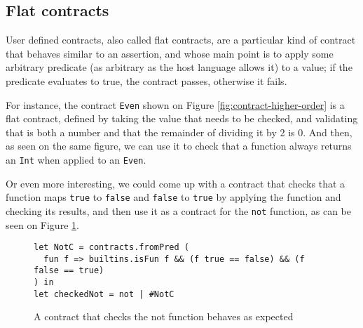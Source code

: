 \documentclass[sigplan,10pt,review,anonymous]{acmart}
\newcommand{\unsure}[2][1=]{}
\newcommand{\nickel}[1]{\lstinline[language=nickel]{#1}}
\begin{document}
\subsection*{Flat contracts}
\label{sec:flat-contracts}

\unsure{Should we define contracts prior to this?}
User defined contracts, also called flat contracts, are a particular
kind of contract that behaves similar to an assertion, and whose
main point is to apply some arbitrary predicate (as arbitrary as the
host language allows it) to a value; if the predicate evaluates to
true, the contract passes, otherwise it fails.

For instance, the contract \nickel{Even} shown on Figure
\ref{fig:contract-higher-order} is a flat contract, defined
by taking the value that needs to be checked, and validating
that is both a number and that the remainder of dividing it by 2
is 0.
And then, as seen on the same figure, we can use it to check that a function always
returns an \nickel{Int} when applied to an \nickel{Even}.



Or even more interesting, we could come up with a contract that checks that a function
maps \nickel{true} to \nickel{false} and \nickel{false} to \nickel{true}
by applying the function and checking its results,
and then use it as a contract for the \nickel{not} function, as can be seen on Figure
\ref{fig:checked-not}.

\begin{figure}[h]
  \begin{center}
\begin{lstlisting}[language=nickel]
let NotC = contracts.fromPred (
  fun f => builtins.isFun f && (f true == false) && (f false == true)
) in
let checkedNot = not | #NotC
\end{lstlisting}
\end{center}
\caption{A contract that checks the not function behaves as expected}
\label{fig:checked-not}
\end{figure}
\end{document}

